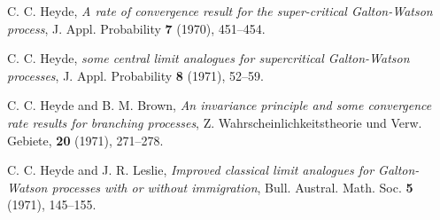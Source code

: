 \documentclass[12pt,a4paper]{amsart}
\theoremstyle{plain}
\theoremstyle{definition}
\numberwithin{equation}{section}
\begin{document}
\begin{thebibliography}{10}

%
%
%
%
%
C. C. Heyde,
 \emph{A rate of convergence result for the super-critical {G}alton-{W}atson process},
  J. Appl. Probability \textbf{7} (1970), 451--454.

  C. C. Heyde,
    \emph{some central limit analogues for supercritical {G}alton-{W}atson processes},
  J. Appl. Probability \textbf{8} (1971), 52--59.

  C. C. Heyde and B. M. Brown,
  \emph{An invariance principle and some convergence rate results for branching processes},
 Z. Wahrscheinlichkeitstheorie und Verw. Gebiete, \textbf{20} (1971), 271--278.

  C. C. Heyde and J. R. Leslie,
  \emph{Improved classical limit analogues for {G}alton-{W}atson processes with or without immigration},
  Bull. Austral. Math. Soc. \textbf{5} (1971), 145--155.

%


\end{thebibliography}
\end{document}

